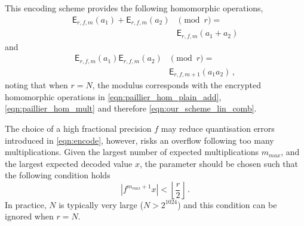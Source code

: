 \documentclass[10pt,journal,compsoc]{IEEEtran}
\theoremstyle{definition}
\theoremstyle{definition}
\theoremstyle{remark}
\begin{document}
This encoding scheme provides the following homomorphic operations,
\begin{equation}
    \begin{split}
        \mathsf{E}_{r,f,m}(a_1) + \mathsf{E}_{r,f,m}(a_2)& \pmod{r} =\\
        &\mathsf{E}_{r,f,m}(a_1+a_2)
    \end{split}\label{eqn:encoding_homomorphic_add}
\end{equation}
and
\begin{equation}
    \begin{split}
        \mathsf{E}_{r,f,m}(a_1)\mathsf{E}_{r,f,m}(a_2)& \pmod{r} =\\
        &\mathsf{E}_{r,f,m+1}(a_1a_2)\,,
    \end{split}
\end{equation}
noting that when $r=N$, the modulus corresponds with the encrypted homomorphic operations in \eqref{eqn:paillier_hom_plain_add}, \eqref{eqn:paillier_hom_mult} and therefore \eqref{eqn:our_scheme_lin_comb}.

The choice of a high fractional precision $f$ may reduce quantisation errors introduced in \eqref{eqn:encode}, however, risks an overflow following too many multiplications. Given the largest number of expected multiplications $m_{max}$, and the largest expected decoded value $x$, the parameter should be chosen such that the following condition holds
\begin{equation}
    \left|f^{m_{max}+1}x\right| < \left\lfloor \frac{r}{2} \right\rfloor\,.
\end{equation}
In practice, $N$ is typically very large ($N>2^{1024}$) and this condition can be ignored when $r=N$.

% 
% 
\end{document}
